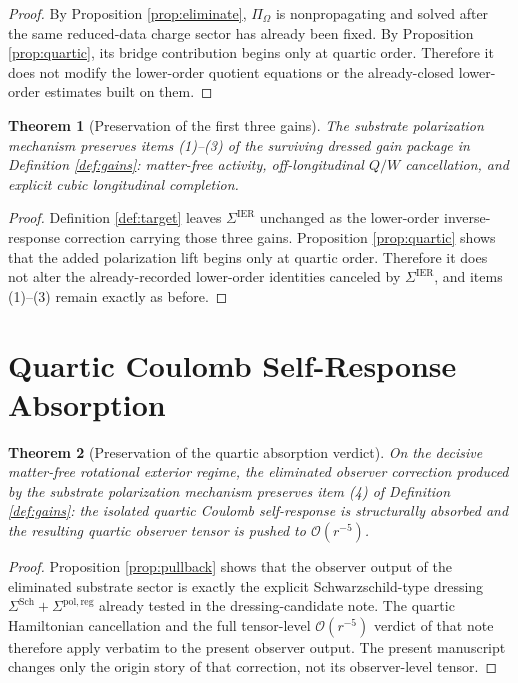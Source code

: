\documentclass[11pt]{article}
\newcommand{\SigmaIER}{\Sigma^{\mathrm{IER}}}
\newcommand{\SigmaDressSch}{\Sigma^{\mathrm{Sch}}}
\newcommand{\SigmaRegPol}{\Sigma^{\mathrm{pol,reg}}}
\newcommand{\BalanceField}{\Pi_\Omega}
\newtheorem{theorem}{Theorem}
\begin{document}
\begin{proof}
By Proposition \ref{prop:eliminate}, \(\BalanceField\) is nonpropagating and solved after the same reduced-data charge sector has already been fixed. By Proposition \ref{prop:quartic}, its bridge contribution begins only at quartic order. Therefore it does not modify the lower-order quotient equations or the already-closed lower-order estimates built on them.
\end{proof}

\begin{theorem}[Preservation of the first three gains]
\label{thm:preserve}
The substrate polarization mechanism preserves items (1)--(3) of the surviving dressed gain package in Definition \ref{def:gains}: matter-free activity, off-longitudinal \(Q/W\) cancellation, and explicit cubic longitudinal completion.
\end{theorem}

\begin{proof}
Definition \ref{def:target} leaves \(\SigmaIER\) unchanged as the lower-order inverse-response correction carrying those three gains. Proposition \ref{prop:quartic} shows that the added polarization lift begins only at quartic order. Therefore it does not alter the already-recorded lower-order identities canceled by \(\SigmaIER\), and items (1)--(3) remain exactly as before.
\end{proof}

\section{Quartic Coulomb Self-Response Absorption}

\begin{theorem}[Preservation of the quartic absorption verdict]
\label{thm:quartic}
On the decisive matter-free rotational exterior regime, the eliminated observer correction produced by the substrate polarization mechanism preserves item (4) of Definition \ref{def:gains}: the isolated quartic Coulomb self-response is structurally absorbed and the resulting quartic observer tensor is pushed to \(\mathcal O(r^{-5})\).
\end{theorem}

\begin{proof}
Proposition \ref{prop:pullback} shows that the observer output of the eliminated substrate sector is exactly the explicit Schwarzschild-type dressing \(\SigmaDressSch+\SigmaRegPol\) already tested in the dressing-candidate note. The quartic Hamiltonian cancellation and the full tensor-level \(\mathcal O(r^{-5})\) verdict of that note therefore apply verbatim to the present observer output. The present manuscript changes only the origin story of that correction, not its observer-level tensor.
\end{proof}
\end{document}
